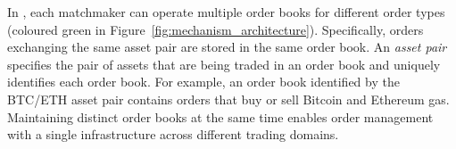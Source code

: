In \ModelName{}, each matchmaker can operate multiple order books for different order types (coloured green in Figure~\ref{fig:mechanism_architecture}).
Specifically, orders exchanging the same asset pair are stored in the same order book.
An \emph{asset pair} specifies the pair of assets that are being traded in an order book and uniquely identifies each order book.
For example, an order book identified by the BTC/ETH asset pair contains orders that buy or sell Bitcoin and Ethereum gas.
Maintaining distinct order books at the same time enables order management with a single infrastructure across different trading domains.




